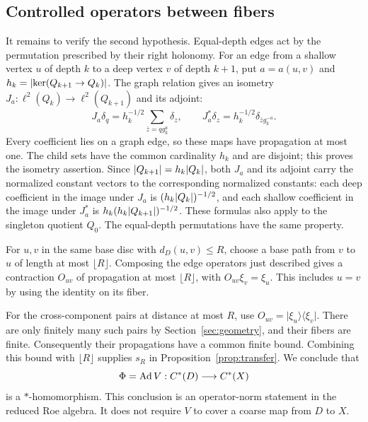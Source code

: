 \subsection{Controlled operators between fibers}
It remains to verify the second hypothesis. Equal-depth edges act by the
permutation prescribed by their right holonomy. For an edge from a shallow
vertex $u$ of depth $k$ to a deep vertex $v$ of depth $k+1$, put
$a=a(u,v)$ and $h_k=\lvert \ker(Q_{k+1}\to Q_k)\rvert$. The graph relation gives
an isometry $J_a:\ell^2(Q_k)\to\ell^2(Q_{k+1})$ and its adjoint:
\begin{equation}\label{eq:childmap}
 J_a\delta_q=h_k^{-1/2}
       \sum_{\bar z=qg_k^a}\delta_z,
 \qquad
 J_a^*\delta_z=h_k^{-1/2}\delta_{\bar z g_k^{-a}}.
\end{equation}
Every coefficient lies on a graph edge, so these maps have propagation at
most one. The child sets have the common cardinality $h_k$ and are disjoint;
this proves the isometry assertion. Since $\lvert Q_{k+1}\rvert=h_k\lvert Q_k\rvert$,
both $J_a$ and its adjoint carry the normalized constant vectors to the
corresponding normalized constants: each deep coefficient in the image
under $J_a$ is $(h_k\lvert Q_k\rvert)^{-1/2}$, and each shallow coefficient
in the image under $J_a^*$ is $h_k(h_k\lvert Q_{k+1}\rvert)^{-1/2}$.
These formulas also apply to the singleton quotient $Q_0$.
The equal-depth permutations have the
same property.

For $u,v$ in the same base disc with $d_D(u,v)\le R$, choose a base path
from $v$ to $u$ of length at most $\lfloor R\rfloor$. Composing the edge
operators just described gives a contraction $O_{uv}$ of propagation at
most $\lfloor R\rfloor$, with $O_{uv}\xi_v=\xi_u$. This includes $u=v$
by using the identity on its fiber.

For the cross-component pairs at distance at most $R$, use
$O_{uv}=\lvert\xi_u\rangle\langle\xi_v\rvert$. There are only finitely
many such pairs by Section~\ref{sec:geometry}, and their fibers are finite.
Consequently their propagations have a common finite bound. Combining this
bound with $\lfloor R\rfloor$ supplies $s_R$ in
Proposition~\ref{prop:transfer}. We conclude that
\begin{equation}\label{eq:Phi}
 \Phi=\operatorname{Ad} V:C^*(D)\longrightarrow C^*(X)
\end{equation}
is a $*$-homomorphism.
This conclusion is an operator-norm statement in the reduced Roe algebra.
It does not require $V$ to cover a coarse map from $D$ to $X$.
